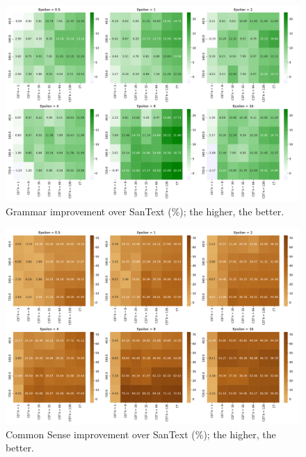 \begin{figure}
    \centering
    \includegraphics[width=15cm]{latex/fig/heatmap_grammar.pdf}
    \caption{Grammar improvement over SanText (\%); the higher, the better.}
    \label{fig:grammar}
\end{figure}


\begin{figure}
    \centering
    \includegraphics[width=15cm]{latex/fig/heatmap_common_sense.pdf}
    \caption{Common Sense improvement over SanText (\%); the higher, the better.}
    \label{fig:common_sense}
\end{figure}



